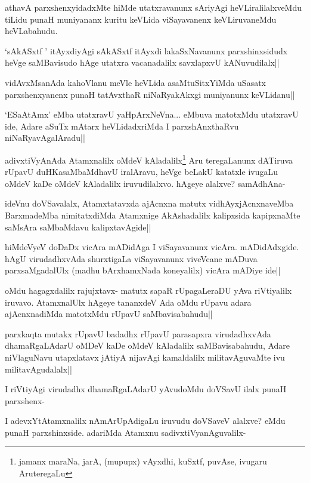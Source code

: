 \begin{artha}
athavA parxshenxyidadxMte hiMde utatxravanunx sAriyAgi heVLiralilalxveMdu tiLidu punaH muniyananx kuritu keVLida viSayavanenx keVLiruvaneMdu heVLabahudu.
\end{artha}

\begin{artha}%
`sAkASxtf ' itAyxdiyAgi sAkASxtf itAyxdi lakaSxNavanunx parxshinxsidudx heVge saMBavisudo hAge utatxra vacanadalilx  savxlapxvU kANuvudilalx||
\end{artha}

\begin{artha}
vidAvxMsanAda kahoVlanu meVle heVLida asaMtuSitxYiMda uSasatx parxshenxyanenx punaH tatAvxthaR niNaRyakAkxgi muniyanunx keVLidanu||
\end{artha}


\begin{artha}
`ESaAtAmx' eMba utatxravU yaHpArxNeVna... eMbuva matotxMdu utatxravU ide, Adare aSuTx mAtarx heVLidadxriMda I parxshAnxthaRvu niNaRyavAgalAradu||
\end{artha}


\begin{artha}
adivxtiVyAnAda Atamxnalilx oMdeV kAladalilx\footnote[1]{jamanx maraNa, jarA, (mupupx) vAyxdhi, kuSxtf, puvAse, ivugaru AruteregaLu}  Aru teregaLanunx dATiruva rUpavU duHKasaMbaMdhavU iralAravu, heVge beLakU katatxle ivugaLu oMdeV kaDe oMdeV kAladalilx iruvudilalxvo. hAgeye alalxve? samAdhAna-
\end{artha}

\begin{artha}%
ideVnu doVSavalalx, Atamxtatavxda ajAcnxna matutx vidhAyxjAcnxnaveMba BarxmadeMba nimitatxdiMda Atamxnige AkAshadalilx kalipxsida kapipxnaMte saMsAra saMbaMdavu kalipxtavAgide||
\end{artha}

\begin{artha}
hiMdeVyeV doDaDx vicAra mADidAga I viSayavanunx vicAra. mADidAdxgide. hAgU virudadhxvAda shurxtigaLa viSayavanunx viveVcane mADuva parxsaMgadalUlx (madhu bArxhamxNada koneyalilx) vicAra mADiye ide||
\end{artha}

\begin{artha}
oMdu hagagxdalilx rajujxtavx- matutx sapaR rUpagaLeraDU yAva riVtiyalilx iruvavo. AtamxnalUlx hAgeye tananxdeV Ada oMdu rUpavu adara ajAcnxnadiMda matotxMdu rUpavU saMbavisabahudu||

parxkaqta mutakx rUpavU badadhx rUpavU parasapxra virudadhxvAda dhamaRgaLAdarU oMDeV kaDe oMdeV kAladalilx saMBavisabahudu, Adare niVlaguNavu utapxlatavx jAtiyA nijavAgi kamaldalilx militavAguvaMte ivu militavAgudalalx||

I riVtiyAgi virudadhx dhamaRgaLAdarU yAvudoMdu doVSavU ilalx punaH parxshenx-

I adevxYtAtamxnalilx nAmArUpAdigaLu iruvudu doVSaveV alalxve? eMdu punaH parxshinxside. adariMda Atamxnu sadivxtiVyanAguvalilx-
\end{artha}%

